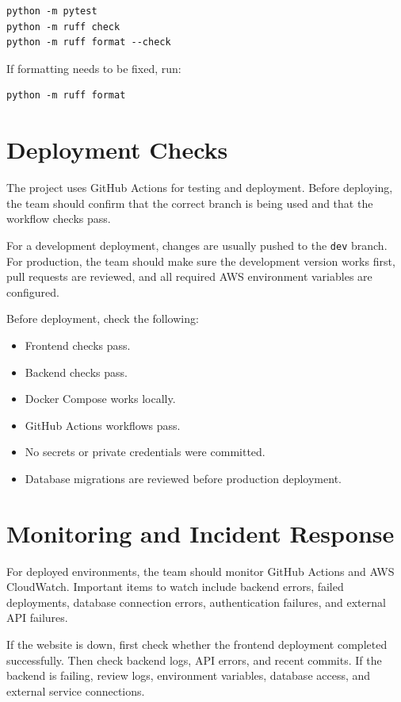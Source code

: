 \documentclass{article}
\begin{document}
\begin{verbatim}
python -m pytest
python -m ruff check
python -m ruff format --check
\end{verbatim}

If formatting needs to be fixed, run:

\begin{verbatim}
python -m ruff format
\end{verbatim}

\section{Deployment Checks}
The project uses GitHub Actions for testing and deployment. Before deploying, the team should confirm that the correct branch is being used and that the workflow checks pass.

For a development deployment, changes are usually pushed to the \texttt{dev} branch. For production, the team should make sure the development version works first, pull requests are reviewed, and all required AWS environment variables are configured.

Before deployment, check the following:

\begin{itemize}
    \item Frontend checks pass.
    \item Backend checks pass.
    \item Docker Compose works locally.
    \item GitHub Actions workflows pass.
    \item No secrets or private credentials were committed.
    \item Database migrations are reviewed before production deployment.
\end{itemize}

\section{Monitoring and Incident Response}
For deployed environments, the team should monitor GitHub Actions and AWS CloudWatch. Important items to watch include backend errors, failed deployments, database connection errors, authentication failures, and external API failures.

If the website is down, first check whether the frontend deployment completed successfully. Then check backend logs, API errors, and recent commits. If the backend is failing, review logs, environment variables, database access, and external service connections.
\end{document}
